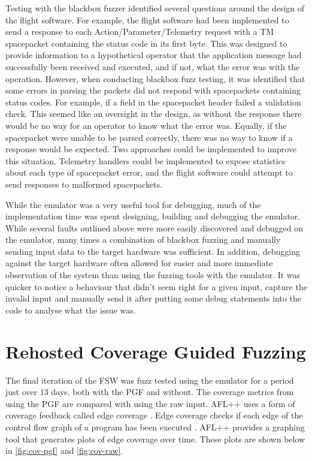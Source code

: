 \documentclass[../report.tex]{subfiles}
\begin{document}
Testing with the blackbox fuzzer identified several questions around the design
of the flight software. For example, the flight software had been implemented
to send a response to each Action/Parameter/Telemetry request with a TM
spacepacket containing the status code in its first byte. This was designed to
provide information to a hypothetical operator that the application message had
successfully been received and executed, and if not, what the error was with
the operation. However, when conducting blackbox fuzz testing, it was
identified that some errors in parsing the packets did not respond with
spacepackets containing status codes. For example, if a field in the
spacepacket header failed a validation check. This seemed like an oversight in
the design, as without the response there would be no way for an operator to
know what the error was. Equally, if the spacepacket were unable to be parsed
correctly, there was no way to know if a response would be expected. Two
approaches could be implemented to improve this situation. Telemetry handlers
could be implemented to expose statistics about each type of spacepacket error,
and the flight software could attempt to send responses to malformed spacepackets.

While the emulator was a very useful tool for debugging, much of the
implementation time was spent designing, building and debugging the emulator.
While several faults outlined above were more easily discovered and debugged on
the emulator, many times a combination of blackbox fuzzing and manually sending
input data to the target hardware was sufficient. In addition, debugging
against the target hardware often allowed for easier and more immediate
observation of the system than using the fuzzing tools with the emulator. It
was quicker to notice a behaviour that didn't seem right for a given input,
capture the invalid input and manually send it after putting some debug
statements into the code to analyse what the issue was.

\section{Rehosted Coverage Guided Fuzzing}

The final iteration of the FSW was fuzz tested using the emulator for a period
just over 13 days, both with the PGF and without. The coverage metrics from
using the PGF are compared with using the raw input. AFL++ uses a form of
coverage feedback called edge coverage \citep{AFLplusplus}. Edge coverage
checks if each edge of the control flow graph of a program has been executed
\citep{edgecoverage}. AFL++ provides a graphing tool that generates plots of
edge coverage over time. These plots are shown below in \autoref{fig:cov-pgf}
and \autoref{fig:cov-raw}.
\end{document}
